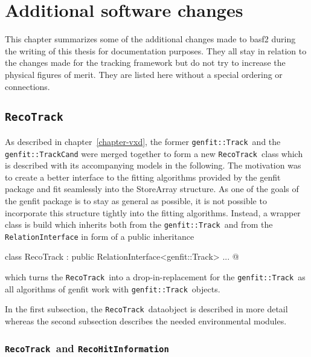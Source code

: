 \newcommand{\RecoTrack}{\texttt{RecoTrack}\ }
\newcommand{\Track}{\texttt{genfit::Track}\ }
\newcommand{\Hit}{\texttt{RecoHitInformation}\ }
\chapter{Additional software changes} \label{chapter-addon}

This chapter summarizes some of the additional changes made to basf2 during the writing of this thesis for documentation purposes. They all stay in relation to the changes made for the tracking framework but do not try to increase the physical figures of merit. They are listed here without a special ordering or connections.

\section{\texttt{RecoTrack}}
As described in chapter~\ref{chapter-vxd}, the former \Track and the \texttt{genfit::TrackCand} were merged together to form a new \RecoTrack class which is described with its accompanying models in the following. The motivation was to create a better interface to the fitting algorithms provided by the genfit package and fit seamlessly into the StoreArray structure. As one of the goals of the genfit package is to stay as general as possible, it is not possible to incorporate this structure tightly into the fitting algorithms. Instead, a wrapper class is build which inherits both from the \Track and from the \texttt{RelationInterface} in form of a public inheritance 
\begin{center}
  \lstset{escapechar=@,style=customC}
  \lstinline@ class RecoTrack : public RelationInterface<genfit::Track> { ... }@
\end{center}
which turns the \RecoTrack into a drop-in-replacement for the \Track as all algorithms of genfit work with \Track objects. 

In the first subsection, the \RecoTrack dataobject is described in more detail whereas the second subsection describes the needed environmental modules.

\subsection{\RecoTrack and \Hit}

